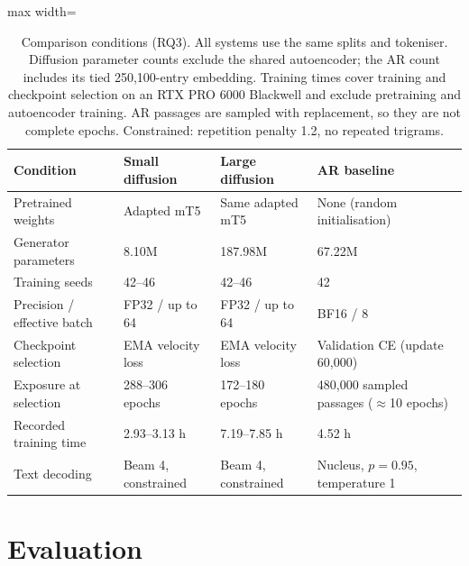 \documentclass[11pt,a4paper]{article}
\begin{document}
\begin{table}[t]
\centering
\small
\begin{adjustbox}{max width=\textwidth}
\begin{tabular}{llll}
\toprule
Condition & Small diffusion & Large diffusion & AR baseline \\
\midrule
Pretrained weights & Adapted mT5 & Same adapted mT5 & None (random initialisation) \\
Generator parameters & 8.10M & 187.98M & 67.22M \\
Training seeds & 42--46 & 42--46 & 42 \\
Precision / effective batch & FP32 / up to 64 & FP32 / up to 64 & BF16 / 8 \\
Checkpoint selection & EMA velocity loss & EMA velocity loss & Validation CE (update 60,000) \\
Exposure at selection & 288--306 epochs & 172--180 epochs & 480,000 sampled passages ($\approx$10 epochs) \\
Recorded training time & 2.93--3.13 h & 7.19--7.85 h & 4.52 h \\
Text decoding & Beam 4, constrained & Beam 4, constrained & Nucleus, $p=0.95$, temperature 1 \\
\bottomrule
\end{tabular}
\end{adjustbox}
\caption{Comparison conditions (RQ3). All systems use the same splits and tokeniser. Diffusion parameter counts exclude the shared autoencoder; the AR count includes its tied 250,100-entry embedding. Training times cover training and checkpoint selection on an RTX PRO 6000 Blackwell and exclude pretraining and autoencoder training. AR passages are sampled with replacement, so they are not complete epochs. Constrained: repetition penalty 1.2, no repeated trigrams.}
\label{tab:conditions}
\end{table}

\section{Evaluation}
\label{sec:evaluation}
\end{document}
